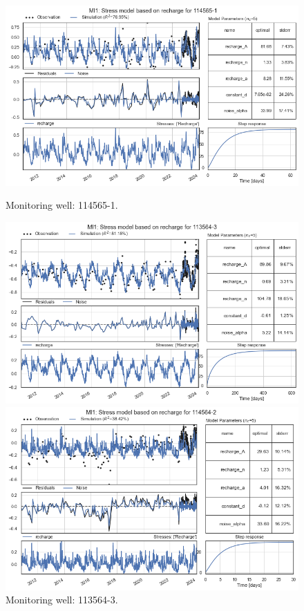 \begin{figure}[htbp]
    \centering
    \begin{minipage}{0.32\textwidth}
        \centering
        \includegraphics[width=\linewidth]{frontmatter/Rozenburg-fig/16.png}
        \caption{Monitoring well: 114565-1.}
        \label{fig:112565-3}
    \end{minipage}
    \hfill
    \begin{minipage}{0.32\textwidth}
        \centering
        \includegraphics[width=\linewidth]{frontmatter/Rozenburg-fig/17.png}
        \caption{Monitoring well: 113564-3.}
        \label{fig:112565-3}
    \end{minipage}
    \hfill
    \begin{minipage}{0.32\textwidth}
        \centering
        \includegraphics[width=\linewidth]{frontmatter/Rozenburg-fig/18.png}

\end{minipage}
\end{figure}
